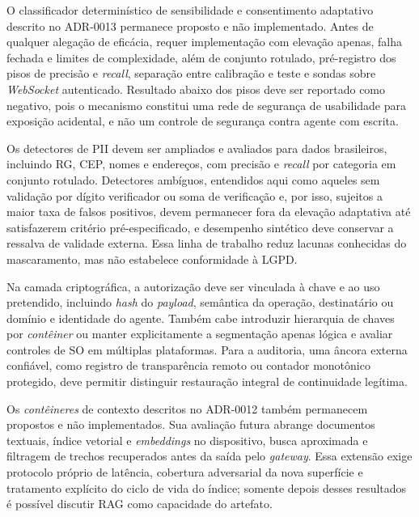\documentclass[12pt,openright,twoside,a4paper,english,brazil]{abntex2}
\begin{document}
O classificador determinístico de sensibilidade e consentimento adaptativo descrito no ADR-0013 permanece proposto e não implementado. Antes de qualquer alegação de eficácia, requer implementação com elevação apenas, falha fechada e limites de complexidade, além de conjunto rotulado, pré-registro dos pisos de precisão e \textit{recall}, separação entre calibração e teste e sondas sobre \textit{WebSocket} autenticado. Resultado abaixo dos pisos deve ser reportado como negativo, pois o mecanismo constitui uma rede de segurança de usabilidade para exposição acidental, e não um controle de segurança contra agente com escrita.

Os detectores de PII devem ser ampliados e avaliados para dados brasileiros, incluindo RG, CEP, nomes e endereços, com precisão e \textit{recall} por categoria em conjunto rotulado. Detectores ambíguos, entendidos aqui como aqueles sem validação por dígito verificador ou soma de verificação e, por isso, sujeitos a maior taxa de falsos positivos, devem permanecer fora da elevação adaptativa até satisfazerem critério pré-especificado, e desempenho sintético deve conservar a ressalva de validade externa. Essa linha de trabalho reduz lacunas conhecidas do mascaramento, mas não estabelece conformidade à LGPD.

Na camada criptográfica, a autorização deve ser vinculada à chave e ao uso pretendido, incluindo \textit{hash} do \textit{payload}, semântica da operação, destinatário ou domínio e identidade do agente. Também cabe introduzir hierarquia de chaves por \textit{contêiner} ou manter explicitamente a segmentação apenas lógica e avaliar controles de SO em múltiplas plataformas. Para a auditoria, uma âncora externa confiável, como registro de transparência remoto ou contador monotônico protegido, deve permitir distinguir restauração integral de continuidade legítima.

Os \textit{contêineres} de contexto descritos no ADR-0012 também permanecem propostos e não implementados. Sua avaliação futura abrange documentos textuais, índice vetorial e \textit{embeddings} no dispositivo, busca aproximada e filtragem de trechos recuperados antes da saída pelo \textit{gateway}. Essa extensão exige protocolo próprio de latência, cobertura adversarial da nova superfície e tratamento explícito do ciclo de vida do índice; somente depois desses resultados é possível discutir RAG como capacidade do artefato.
\end{document}
